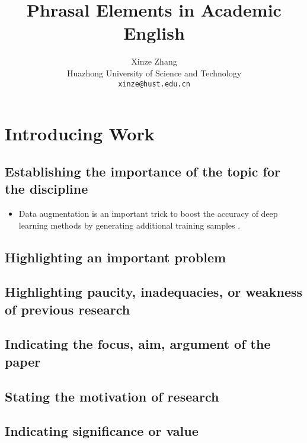 \documentclass[11pt,onecolumn]{article}
\begin{document}
\title{Phrasal Elements in Academic English}
\author{Xinze Zhang\\
Huazhong University of Science and Technology \\
\texttt{xinze@hust.edu.cn} \\}

\maketitle


\section{Introducing Work}

\subsection{Establishing the importance of the topic for the discipline}
\begin{itemize}
    \item Data augmentation is an important trick to boost the accuracy of deep learning methods by generating additional training samples \cite{gaoSoft2019}.
\end{itemize}

\subsection{Highlighting an important problem}


\subsection{Highlighting paucity, inadequacies, or weakness of previous research}

\subsection{Indicating the focus, aim, argument of the paper}

\subsection{Stating the motivation of research}

\subsection{Indicating significance or value}
\end{document}
